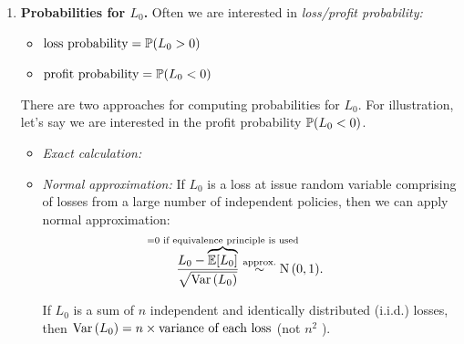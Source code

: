 \begin{enumerate}
\begin{itemize}
\begin{enumerate}[label={(\arabic*)}]
\begin{center}
\end{center}
\item \emph{Calculate \(\expv{L_0}\) and \(\expv{L_0^{2}}\):}
\item \emph{Calculate \(\vari{L_0}\):}
\(\vari{L_0}=\expv{L_0^2}-(\expv{L_0})^{2}\overset{\text{(equivalence
principle)}}{=}\expv{L_0^{2}}\).
\end{enumerate}
\end{itemize}
\item\label{it:l0-probs} \textbf{Probabilities for \(L_0\).} Often we are
interested in \emph{loss/profit probability:}
\begin{itemize}
\item \(\text{loss probability}=\mathbb{P}\qty(L_0>0)\)
\item \(\text{profit probability}=\mathbb{P}\qty(L_0<0)\)
\end{itemize}
There are two approaches for computing probabilities for \(L_0\). For
illustration, let's say we are interested in the profit probability
\(\mathbb{P}\qty(L_0<0)\).
\begin{itemize}
\item \emph{Exact calculation:}
\item \emph{Normal approximation:} If \(L_0\) is a loss at issue random
variable comprising of losses from a large number of independent policies, then
we can apply normal approximation:
\[
\frac{L_0-\overbrace{\expv{L_0}}^{\mathclap{=0\text{ if equivalence principle is used}}}}{\sqrt{\vari{L_0}}}\apxsim \ndist{0,1}.
\]
\begin{note}
If \(L_0\) is a sum of \(n\) independent and identically distributed (i.i.d.)
losses, then \(\operatorname{Var}\qty(L_0)=n\times \text{variance of each loss}\) (not \(n^{2}\)
\warn{}).
\end{note}


\end{itemize}
\end{enumerate}
